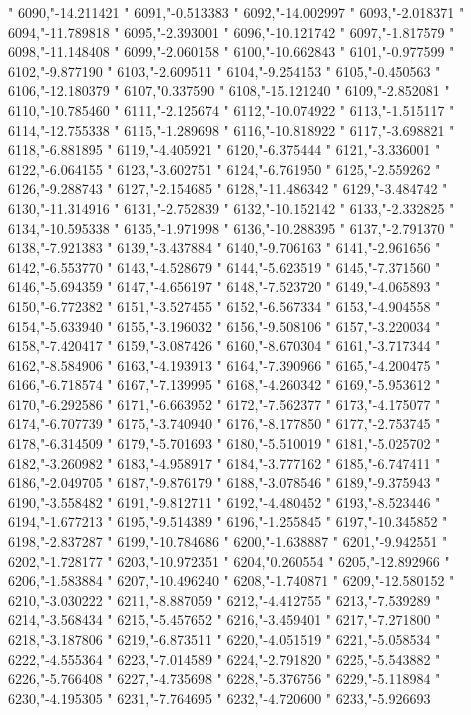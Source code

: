 "
6090,"-14.211421
"
6091,"-0.513383
"
6092,"-14.002997
"
6093,"-2.018371
"
6094,"-11.789818
"
6095,"-2.393001
"
6096,"-10.121742
"
6097,"-1.817579
"
6098,"-11.148408
"
6099,"-2.060158
"
6100,"-10.662843
"
6101,"-0.977599
"
6102,"-9.877190
"
6103,"-2.609511
"
6104,"-9.254153
"
6105,"-0.450563
"
6106,"-12.180379
"
6107,"0.337590
"
6108,"-15.121240
"
6109,"-2.852081
"
6110,"-10.785460
"
6111,"-2.125674
"
6112,"-10.074922
"
6113,"-1.515117
"
6114,"-12.755338
"
6115,"-1.289698
"
6116,"-10.818922
"
6117,"-3.698821
"
6118,"-6.881895
"
6119,"-4.405921
"
6120,"-6.375444
"
6121,"-3.336001
"
6122,"-6.064155
"
6123,"-3.602751
"
6124,"-6.761950
"
6125,"-2.559262
"
6126,"-9.288743
"
6127,"-2.154685
"
6128,"-11.486342
"
6129,"-3.484742
"
6130,"-11.314916
"
6131,"-2.752839
"
6132,"-10.152142
"
6133,"-2.332825
"
6134,"-10.595338
"
6135,"-1.971998
"
6136,"-10.288395
"
6137,"-2.791370
"
6138,"-7.921383
"
6139,"-3.437884
"
6140,"-9.706163
"
6141,"-2.961656
"
6142,"-6.553770
"
6143,"-4.528679
"
6144,"-5.623519
"
6145,"-7.371560
"
6146,"-5.694359
"
6147,"-4.656197
"
6148,"-7.523720
"
6149,"-4.065893
"
6150,"-6.772382
"
6151,"-3.527455
"
6152,"-6.567334
"
6153,"-4.904558
"
6154,"-5.633940
"
6155,"-3.196032
"
6156,"-9.508106
"
6157,"-3.220034
"
6158,"-7.420417
"
6159,"-3.087426
"
6160,"-8.670304
"
6161,"-3.717344
"
6162,"-8.584906
"
6163,"-4.193913
"
6164,"-7.390966
"
6165,"-4.200475
"
6166,"-6.718574
"
6167,"-7.139995
"
6168,"-4.260342
"
6169,"-5.953612
"
6170,"-6.292586
"
6171,"-6.663952
"
6172,"-7.562377
"
6173,"-4.175077
"
6174,"-6.707739
"
6175,"-3.740940
"
6176,"-8.177850
"
6177,"-2.753745
"
6178,"-6.314509
"
6179,"-5.701693
"
6180,"-5.510019
"
6181,"-5.025702
"
6182,"-3.260982
"
6183,"-4.958917
"
6184,"-3.777162
"
6185,"-6.747411
"
6186,"-2.049705
"
6187,"-9.876179
"
6188,"-3.078546
"
6189,"-9.375943
"
6190,"-3.558482
"
6191,"-9.812711
"
6192,"-4.480452
"
6193,"-8.523446
"
6194,"-1.677213
"
6195,"-9.514389
"
6196,"-1.255845
"
6197,"-10.345852
"
6198,"-2.837287
"
6199,"-10.784686
"
6200,"-1.638887
"
6201,"-9.942551
"
6202,"-1.728177
"
6203,"-10.972351
"
6204,"0.260554
"
6205,"-12.892966
"
6206,"-1.583884
"
6207,"-10.496240
"
6208,"-1.740871
"
6209,"-12.580152
"
6210,"-3.030222
"
6211,"-8.887059
"
6212,"-4.412755
"
6213,"-7.539289
"
6214,"-3.568434
"
6215,"-5.457652
"
6216,"-3.459401
"
6217,"-7.271800
"
6218,"-3.187806
"
6219,"-6.873511
"
6220,"-4.051519
"
6221,"-5.058534
"
6222,"-4.555364
"
6223,"-7.014589
"
6224,"-2.791820
"
6225,"-5.543882
"
6226,"-5.766408
"
6227,"-4.735698
"
6228,"-5.376756
"
6229,"-5.118984
"
6230,"-4.195305
"
6231,"-7.764695
"
6232,"-4.720600
"
6233,"-5.926693
